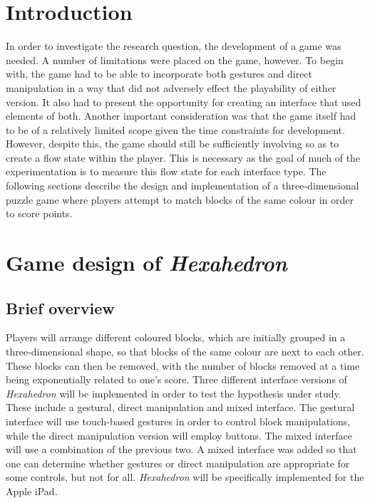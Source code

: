 \graphicspath{{./designDocImages/}}

\section{Introduction}

In order to investigate the research question, the development of a game was needed. A number of limitations were placed on the game, however. To begin with, the game had to be able to incorporate both gestures and direct manipulation in a way that did not adversely effect the playability of either version. It also had to present the opportunity for creating an interface that used elements of both. Another important consideration was that the game itself had to be of a relatively limited scope given the time constraints for development. However, despite this, the game should still be sufficiently involving so as to create a flow state within the player. This is necessary as the goal of much of the experimentation is to measure this flow state for each interface type. The following sections describe the design and implementation of a three-dimensional puzzle game where players attempt to match blocks of the same colour in order to score points.


\section{Game design of \emph{Hexahedron}}

\subsection{Brief overview}
Players will arrange different coloured blocks, which are initially grouped in a three-dimensional \gls{shape}, so that blocks of the same colour are next to each other. These blocks can then be removed, with the number of blocks removed at a time being exponentially related to one's score. Three different interface versions of \emph{Hexahedron} will be implemented in order to test the hypothesis under study. These include a gestural, direct manipulation and mixed interface. The gestural interface will use touch-based gestures in order to control block manipulations, while the direct manipulation version will employ buttons. The mixed interface will use a combination of the previous two. A mixed interface was added so that one can determine whether gestures or direct manipulation are appropriate for some controls, but not for all. \emph{Hexahedron} will be specifically implemented for the Apple iPad.

